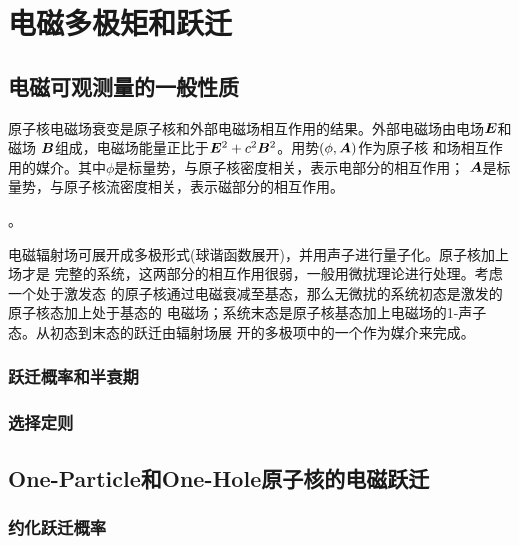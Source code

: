 \chapter{电磁多极矩和跃迁}

\section{电磁可观测量的一般性质}
原子核电磁场衰变是原子核和外部电磁场相互作用的结果。外部电磁场由电场$\bm{E}$和磁场
$\bm{B}$组成，电磁场能量正比于$\bm{E}^2 + c^2 \bm{B}^2$。用势$(\phi, \bm{A})$作为原子核
和场相互作用的媒介。其中$\phi$是标量势，与原子核密度相关，表示电部分的相互作用；
$\bm{A}$是标量势，与原子核流密度相关，表示磁部分的相互作用。

。

电磁辐射场可展开成多极形式(球谐函数展开)，并用声子进行量子化。原子核加上场才是
完整的系统，这两部分的相互作用很弱，一般用微扰理论进行处理。考虑一个处于激发态
的原子核通过电磁衰减至基态，那么无微扰的系统初态是激发的原子核态加上处于基态的
电磁场；系统末态是原子核基态加上电磁场的1-声子态。从初态到末态的跃迁由辐射场展
开的多极项中的一个作为媒介来完成。

\subsection{跃迁概率和半衰期}


\subsection{选择定则}


\section{One-Particle和One-Hole原子核的电磁跃迁}
\subsection{约化跃迁概率}
